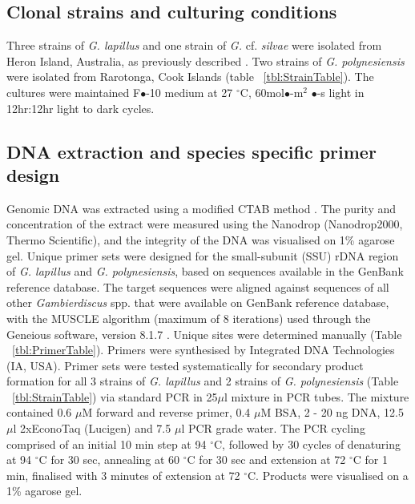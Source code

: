 \documentclass[12pt]{article}
\begin{document}
\subsection*{Clonal strains and culturing conditions}
Three strains of \emph{G. lapillus} 
and one strain of \emph{G.} cf. \emph{silvae} 
were isolated from Heron Island, Australia, as previously described \citep{kretzschmar2016characterization}. Two strains of \emph{G. polynesiensis} were isolated from Rarotonga, Cook Islands (table ~\ref{tbl:StrainTable}). The cultures were maintained F$\bullet$-10 medium at 27 $^{\circ}$C, 60mol$\bullet$-m$^{2}$ $\bullet$-s light in 12hr:12hr light to dark cycles.



\subsection*{DNA extraction and species specific primer design}
Genomic DNA was extracted using a modified CTAB method \citep{verma2016molecular}. The purity and concentration of the extract were measured using the Nanodrop (Nanodrop2000, Thermo Scientific), and the integrity of the DNA was visualised on 1\% agarose gel.
Unique primer sets were designed for the small-subunit (SSU) rDNA region of \emph{G. lapillus} and \emph{G. polynesiensis}, based on sequences available in the GenBank reference database. The target sequences were aligned against sequences of all other \emph{Gambierdiscus} spp. that were available on GenBank reference database, with the MUSCLE algorithm (maximum of 8 iterations) \citep{edgar2004muscle} used through the Geneious software, version 8.1.7 \citep{kearse2012geneious}. Unique sites were determined manually (Table ~\ref{tbl:PrimerTable}). Primers were synthesised by Integrated DNA Technologies (IA, USA).
Primer sets were tested systematically for secondary product formation for all 3 strains of \emph{G. lapillus} and 2 strains of \emph{G. polynesiensis} (Table ~\ref{tbl:StrainTable}) via standard PCR in 25$\mu$l mixture in PCR tubes. The mixture contained 0.6 $\mu$M forward and reverse primer, 0.4 $\mu$M BSA, 2 - 20 ng DNA, 12.5 $\mu$l 2xEconoTaq (Lucigen) and 7.5 $\mu$l PCR grade water.
The PCR cycling comprised of an initial 10 min step at 94 $^{\circ}$C, followed by 30 cycles of denaturing at 94 $^{\circ}$C for 30 sec, annealing at 60 $^{\circ}$C for 30 sec and extension at 72 $^{\circ}$C for 1 min, finalised with 3 minutes of extension at 72 $^{\circ}$C. Products were visualised on a 1\% agarose gel.
\end{document}
